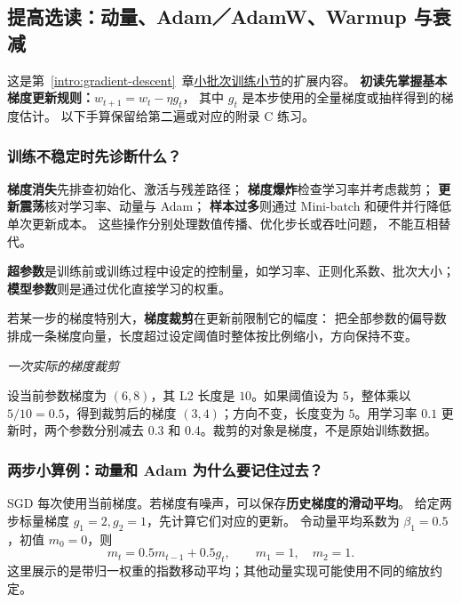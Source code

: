 \subsection{提高选读：动量、Adam／AdamW、Warmup 与衰减}
\label{app:optimizer-details}

这是第~\ref*{intro:gradient-descent}~章\hyperref[intro:mini-batch-training]{小批次训练小节}的扩展内容。
\textbf{初读先掌握基本梯度更新规则：}$w_{t+1}=w_t-\eta g_t$，
其中 $g_t$ 是本步使用的全量梯度或抽样得到的梯度估计。
以下手算保留给第二遍或对应的附录 C 练习。

\subsubsection{训练不稳定时先诊断什么？}
\label{app:training-diagnostics}


\textbf{梯度消失}先排查初始化、激活与残差路径；
\textbf{梯度爆炸}检查学习率并考虑裁剪；
\textbf{更新震荡}核对学习率、动量与 Adam；
\textbf{样本过多}则通过 Mini-batch 和硬件并行降低单次更新成本。
这些操作分别处理数值传播、优化步长或吞吐问题，
不能互相替代。

\textbf{超参数}是训练前或训练过程中设定的控制量，如学习率、正则化系数、批次大小；\textbf{模型参数}则是通过优化直接学习的权重。

若某一步的梯度特别大，\textbf{梯度裁剪}在更新前限制它的幅度：
\label{concept:gradient-clipping}把全部参数的偏导数排成一条梯度向量，长度超过设定阈值时整体按比例缩小，方向保持不变。

\begin{example}
\noindent\emph{一次实际的梯度裁剪}\par

设当前参数梯度为 $(6,8)$，其 L2 长度是 $10$。如果阈值设为 $5$，整体乘以 $5/10=0.5$，得到裁剪后的梯度 $(3,4)$；方向不变，长度变为 $5$。用学习率 $0.1$ 更新时，两个参数分别减去 $0.3$ 和 $0.4$。裁剪的对象是梯度，不是原始训练数据。
\end{example}


\subsubsection{两步小算例：动量和 Adam 为什么要记住过去？}

SGD 每次使用当前梯度。若梯度有噪声，可以保存\textbf{历史梯度的滑动平均}。
给定两步标量梯度 $g_1=2,g_2=1$，先计算它们对应的更新。
令动量平均系数为 $\beta_1=0.5$，初值 $m_0=0$，则
\[
m_t=0.5m_{t-1}+0.5g_t,\qquad m_1=1,\quad m_2=1.
\]
这里展示的是带归一权重的指数移动平均；其他动量实现可能使用不同的缩放约定。

